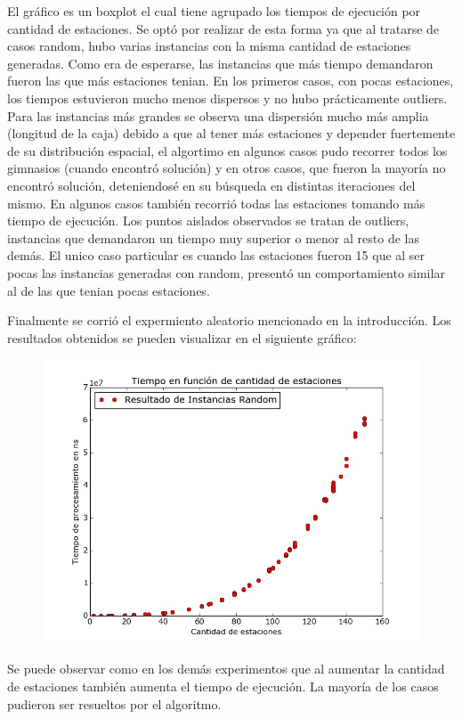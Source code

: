      El gráfico es un boxplot el cual tiene agrupado los tiempos de ejecución por cantidad de estaciones. Se optó por realizar de esta forma ya que al tratarse de casos random, hubo varias instancias con la misma cantidad de estaciones generadas. Como era de esperarse, las instancias que más tiempo demandaron fueron las que más estaciones tenian. En los primeros casos, con pocas estaciones, los tiempos estuvieron mucho menos dispersos y no hubo prácticamente outliers. Para las instancias más grandes se observa una dispersión mucho más amplia (longitud de la caja) debido a que al tener más estaciones y depender fuertemente de su distribución espacial, el algortimo en algunos casos pudo recorrer todos los gimnasios (cuando encontró solución) y en otros casos, que fueron la mayoría no encontró solución, deteniendosé en su búsqueda en distintas iteraciones del mismo. En algunos casos también recorrió todas las estaciones tomando más tiempo de ejecución. Los puntos aislados observados se tratan de outliers, instancias que demandaron un tiempo muy superior o menor al resto de las demás. El unico caso particular es cuando las estaciones fueron 15 que al ser pocas las instancias generadas con random, presentó un comportamiento similar al de las que tenian pocas estaciones.
     
     Finalmente se corrió el expermiento aleatorio mencionado en la introducción. Los resultados obtenidos se pueden visualizar en el siguiente gráfico:

     \begin{figure}[H]
      \begin{center}
        \includegraphics[width=1.0\columnwidth]{imagenes/random_ej2.jpeg}
        \caption{}
      \end{center}
  \end{figure}

    Se puede observar como en los demás experimentos que al aumentar la cantidad de estaciones también aumenta el tiempo de ejecución. La mayoría de los casos pudieron ser resueltos por el algoritmo. 

